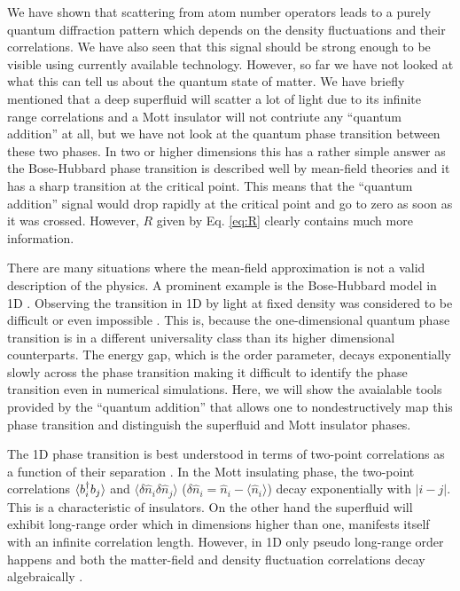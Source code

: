 We have shown that scattering from atom number operators leads to a
purely quantum diffraction pattern which depends on the density
fluctuations and their correlations. We have also seen that this
signal should be strong enough to be visible using currently available
technology. However, so far we have not looked at what this can tell
us about the quantum state of matter. We have briefly mentioned that a
deep superfluid will scatter a lot of light due to its infinite range
correlations and a Mott insulator will not contriute any ``quantum
addition'' at all, but we have not look at the quantum phase
transition between these two phases. In two or higher dimensions this
has a rather simple answer as the Bose-Hubbard phase transition is
described well by mean-field theories and it has a sharp transition at
the critical point. This means that the ``quantum addition'' signal
would drop rapidly at the critical point and go to zero as soon as it
was crossed. However, $R$ given by Eq. \eqref{eq:R} clearly contains
much more information.

There are many situations where the mean-field approximation is not a
valid description of the physics. A prominent example is the
Bose-Hubbard model in 1D \cite{cazalilla2011, ejima2011, kuhner2000,
  pino2012, pino2013}. Observing the transition in 1D by light at
fixed density was considered to be difficult \cite{rogers2014} or even
impossible \cite{roth2003}. This is, because the one-dimensional
quantum phase transition is in a different universality class than its
higher dimensional counterparts. The energy gap, which is the order
parameter, decays exponentially slowly across the phase transition
making it difficult to identify the phase transition even in numerical
simulations. Here, we will show the avaialable tools provided by the
``quantum addition'' that allows one to nondestructively map this
phase transition and distinguish the superfluid and Mott insulator
phases.

The 1D phase transition is best understood in terms of two-point
correlations as a function of their separation \cite{giamarchi}. In
the Mott insulating phase, the two-point correlations $\langle b^\dagger_i
b_j \rangle$ and $\langle \delta \hat{n}_i \delta \hat{n}_j \rangle$
($\delta \hat{n}_i =\hat{n}_i-\langle \hat{n}_i\rangle$) decay
exponentially with $|i-j|$. This is a characteristic of insulators. On
the other hand the superfluid will exhibit long-range order which in
dimensions higher than one, manifests itself with an infinite
correlation length. However, in 1D only pseudo long-range order
happens and both the matter-field and density fluctuation correlations
decay algebraically \cite{giamarchi}.

